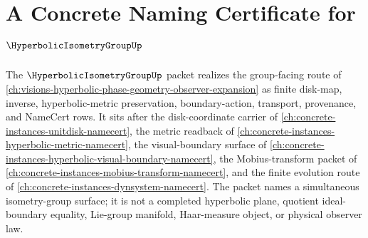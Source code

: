 \chapter{A Concrete Naming Certificate for $\HyperbolicIsometryGroupUp$}
\label{ch:concrete-instances-hyperbolic-isometry-group-namecert}

The $\HyperbolicIsometryGroupUp$ packet realizes the group-facing route of \autoref{ch:visions-hyperbolic-phase-geometry-observer-expansion} as finite disk-map, inverse, hyperbolic-metric preservation, boundary-action, transport, provenance, and NameCert rows. It sits after the disk-coordinate carrier of \autoref{ch:concrete-instances-unitdisk-namecert}, the metric readback of \autoref{ch:concrete-instances-hyperbolic-metric-namecert}, the visual-boundary surface of \autoref{ch:concrete-instances-hyperbolic-visual-boundary-namecert}, the Mobius-transform packet of \autoref{ch:concrete-instances-mobius-transform-namecert}, and the finite evolution route of \autoref{ch:concrete-instances-dynsystem-namecert}. The packet names a simultaneous isometry-group surface; it is not a completed hyperbolic plane, quotient ideal-boundary equality, Lie-group manifold, Haar-measure object, or physical observer law.

